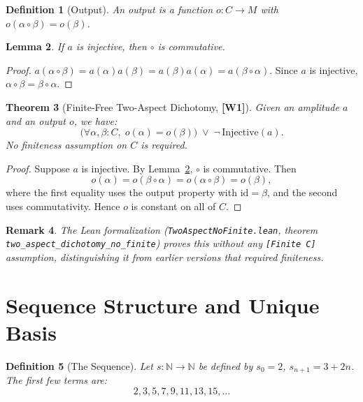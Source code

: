 ﻿\documentclass[11pt]{article}
\newcommand{\wone}[1]{\textcolor{wcolor}{\textbf{[#1]}}}
\newtheorem{theorem}{Theorem}
\newtheorem{lemma}[theorem]{Lemma}
\newtheorem{definition}[theorem]{Definition}
\newtheorem{remark}[theorem]{Remark}
\begin{document}
\begin{definition}[Output]
An \emph{output} is a function $o : C \to M$ with
$o(\alpha \circ \beta) = o(\beta)$.
\end{definition}

\begin{lemma}
\label{lem:comm}
If $a$ is injective, then $\circ$ is commutative.
\end{lemma}

\begin{proof}
$a(\alpha \circ \beta) = a(\alpha) a(\beta)
  = a(\beta) a(\alpha) = a(\beta \circ \alpha)$.
Since $a$ is injective, $\alpha \circ \beta = \beta \circ \alpha$.
\end{proof}

\begin{theorem}[Finite-Free Two-Aspect Dichotomy, \wone{W1}]
\label{thm:dichotomy}
Given an amplitude $a$ and an output $o$, we have:
\[
\bigl(\forall \alpha, \beta : C,\; o(\alpha) = o(\beta)\bigr)
\;\vee\;
\neg\,\mathrm{Injective}(a).
\]
No finiteness assumption on $C$ is required.
\end{theorem}

\begin{proof}
Suppose $a$ is injective. By Lemma~\ref{lem:comm}, $\circ$
is commutative. Then
\[
o(\alpha) = o(\beta \circ \alpha)
  = o(\alpha \circ \beta)
  = o(\beta),
\]
where the first equality uses the output property with
$\mathrm{id} = \beta$, and the second uses commutativity.
Hence $o$ is constant on all of $C$.
\end{proof}

\begin{remark}
The Lean formalization (\texttt{TwoAspectNoFinite.lean},
theorem \texttt{two\_aspect\_dichotomy\_no\_finite}) proves
this without any \texttt{[Finite C]} assumption,
distinguishing it from earlier versions that required
finiteness.
\end{remark}

\section{Sequence Structure and Unique Basis}
\label{sec:sequence}

\begin{definition}[The Sequence]
Let $s : \mathbb{N} \to \mathbb{N}$ be defined by
$s_0 = 2$, $s_{n+1} = 3 + 2n$. The first few terms are:
\[
2, 3, 5, 7, 9, 11, 13, 15, \ldots
\]
\end{definition}
\end{document}
